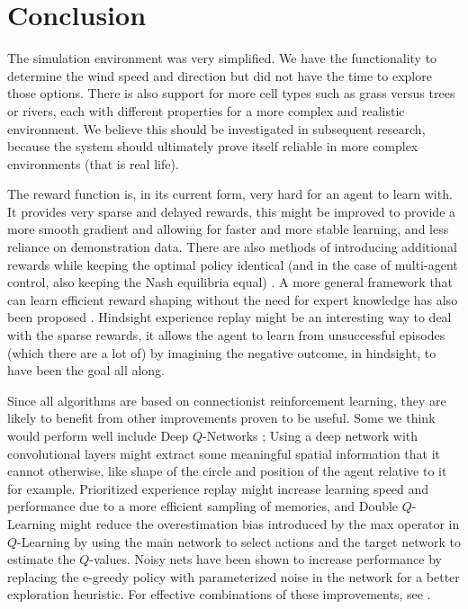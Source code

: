 
\section{Conclusion}\label{sec:conclusions}
The simulation environment was very simplified. We have the functionality to determine the wind speed and direction but did not have the time to explore those options. There is also support for more cell types such as grass versus trees or rivers, each with different properties for a more complex and realistic environment. We believe this should be investigated in subsequent research, because the system should ultimately prove itself reliable in more complex environments (that is real life).

The reward function is, in its current form, very hard for an agent to learn with. It provides very sparse and delayed rewards, this might be improved to provide a more smooth gradient and allowing for faster and more stable learning, and less reliance on demonstration data. There are also methods of introducing additional rewards while keeping the optimal policy identical (and in the case of multi-agent control, also keeping the Nash equilibria equal) \citep{ng1999policy}. A more general framework that can learn efficient reward shaping without the need for expert knowledge has also been proposed \citep{zou2019reward}. Hindsight experience replay \citep{andrychowicz2017hindsight} might be an interesting way to deal with the sparse rewards, it allows the agent to learn from unsuccessful episodes (which there are a lot of) by imagining the negative outcome, in hindsight, to have been the goal all along.

Since all algorithms are based on connectionist reinforcement learning, they are likely to benefit from other improvements proven to be useful. Some we think would perform well include Deep $Q$-Networks \citep{mnih2015human}; Using a deep network with convolutional layers might extract some meaningful spatial information that it cannot otherwise, like shape of the circle and position of the agent relative to it for example. Prioritized experience replay \citep{schaul2015prioritized} might increase learning speed and performance due to a more efficient sampling of memories, and Double $Q$-Learning \citep{hasselt2010double} might reduce the overestimation bias introduced by the max operator in $Q$-Learning by using the main network to select actions and the target network to estimate the $Q$-values. Noisy nets \citep{fortunato2017noisy} have been shown to increase performance by replacing the e-greedy policy with parameterized noise in the network for a better exploration heuristic. For effective combinations of these improvements, see \citep{hessel2018rainbow}.

